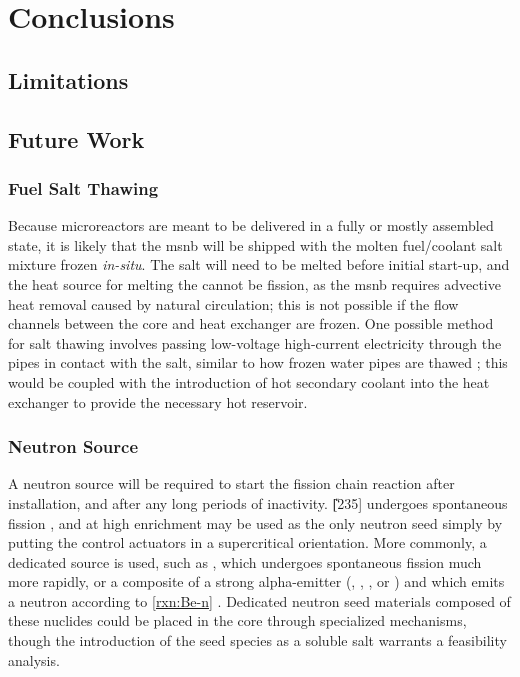 \chapter{Conclusions}
\label{Chapter:Conclusions}

\section{Limitations}


\section{Future Work}\label{Chapter:Conclusions-FutureWork}
\subsection{Fuel Salt Thawing}
Because microreactors are meant to be delivered in a fully or mostly assembled state, it is likely that the \acs{msnb} will be shipped with the molten fuel/coolant salt mixture frozen \textit{in-situ}. The salt will need to be melted before initial start-up, and the heat source for melting the cannot be fission, as the \acs{msnb} requires advective heat removal caused by natural circulation; this is not possible if the flow channels between the core and heat exchanger are frozen. One possible method for salt thawing involves passing low-voltage high-current electricity through the pipes in contact with the salt, similar to how frozen water pipes are thawed \cite{Thawing}; this would be coupled with the introduction of hot secondary coolant into the heat exchanger to provide the necessary hot reservoir.

\subsection{Neutron Source}
A neutron source will be required to start the fission chain reaction after installation, and after any long periods of inactivity. \U[235] undergoes spontaneous fission \cite[Ch. 6]{Faw}, and at high enrichment may be used as the only neutron seed simply by putting the control actuators in a supercritical orientation. More commonly, a dedicated source is used, such as \Ca[252], which undergoes spontaneous fission much more rapidly, or a composite of a strong alpha-emitter (\eg \Pu[238], \Am[241], \Po[210], or \Ra[226]) and \Be[9] which emits a neutron according to \ref{rxn:Be-n} \cite[Ch. 2]{Handbook}. Dedicated neutron seed materials composed of these nuclides could be placed in the core through specialized mechanisms, though the introduction of the seed species as a soluble salt warrants a feasibility analysis.  

